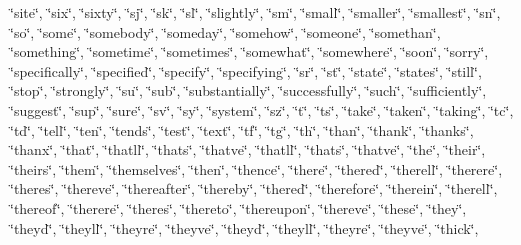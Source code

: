 \char`\"{}site\char`\"{}, \char`\"{}six\char`\"{}, \char`\"{}sixty\char`\"{}, \char`\"{}sj\char`\"{}, \char`\"{}sk\char`\"{}, \char`\"{}sl\char`\"{}, \char`\"{}slightly\char`\"{}, \char`\"{}sm\char`\"{}, \char`\"{}small\char`\"{}, \char`\"{}smaller\char`\"{}, \char`\"{}smallest\char`\"{}, \char`\"{}sn\char`\"{}, \char`\"{}so\char`\"{}, \char`\"{}some\char`\"{}, \char`\"{}somebody\char`\"{}, \char`\"{}someday\char`\"{}, \char`\"{}somehow\char`\"{}, \char`\"{}someone\char`\"{}, \char`\"{}somethan\char`\"{}, \char`\"{}something\char`\"{}, \char`\"{}sometime\char`\"{}, \char`\"{}sometimes\char`\"{}, \char`\"{}somewhat\char`\"{}, \char`\"{}somewhere\char`\"{}, \char`\"{}soon\char`\"{}, \char`\"{}sorry\char`\"{}, \char`\"{}specifically\char`\"{}, \char`\"{}specified\char`\"{}, \char`\"{}specify\char`\"{}, \char`\"{}specifying\char`\"{}, \char`\"{}sr\char`\"{}, \char`\"{}st\char`\"{}, \char`\"{}state\char`\"{}, \char`\"{}states\char`\"{}, \char`\"{}still\char`\"{}, \char`\"{}stop\char`\"{}, \char`\"{}strongly\char`\"{}, \char`\"{}su\char`\"{}, \char`\"{}sub\char`\"{}, \char`\"{}substantially\char`\"{}, \char`\"{}successfully\char`\"{}, \char`\"{}such\char`\"{}, \char`\"{}sufficiently\char`\"{}, \char`\"{}suggest\char`\"{}, \char`\"{}sup\char`\"{}, \char`\"{}sure\char`\"{}, \char`\"{}sv\char`\"{}, \char`\"{}sy\char`\"{}, \char`\"{}system\char`\"{}, \char`\"{}sz\char`\"{}, \char`\"{}t\char`\"{}, \char`\"{}t\textquotesingle{}s\char`\"{}, \char`\"{}take\char`\"{}, \char`\"{}taken\char`\"{}, \char`\"{}taking\char`\"{}, \char`\"{}tc\char`\"{}, \char`\"{}td\char`\"{}, \char`\"{}tell\char`\"{}, \char`\"{}ten\char`\"{}, \char`\"{}tends\char`\"{}, \char`\"{}test\char`\"{}, \char`\"{}text\char`\"{}, \char`\"{}tf\char`\"{}, \char`\"{}tg\char`\"{}, \char`\"{}th\char`\"{}, \char`\"{}than\char`\"{}, \char`\"{}thank\char`\"{}, \char`\"{}thanks\char`\"{}, \char`\"{}thanx\char`\"{}, \char`\"{}that\char`\"{}, \char`\"{}that\textquotesingle{}ll\char`\"{}, \char`\"{}that\textquotesingle{}s\char`\"{}, \char`\"{}that\textquotesingle{}ve\char`\"{}, \char`\"{}thatll\char`\"{}, \char`\"{}thats\char`\"{}, \char`\"{}thatve\char`\"{}, \char`\"{}the\char`\"{}, \char`\"{}their\char`\"{}, \char`\"{}theirs\char`\"{}, \char`\"{}them\char`\"{}, \char`\"{}themselves\char`\"{}, \char`\"{}then\char`\"{}, \char`\"{}thence\char`\"{}, \char`\"{}there\char`\"{}, \char`\"{}there\textquotesingle{}d\char`\"{}, \char`\"{}there\textquotesingle{}ll\char`\"{}, \char`\"{}there\textquotesingle{}re\char`\"{}, \char`\"{}there\textquotesingle{}s\char`\"{}, \char`\"{}there\textquotesingle{}ve\char`\"{}, \char`\"{}thereafter\char`\"{}, \char`\"{}thereby\char`\"{}, \char`\"{}thered\char`\"{}, \char`\"{}therefore\char`\"{}, \char`\"{}therein\char`\"{}, \char`\"{}therell\char`\"{}, \char`\"{}thereof\char`\"{}, \char`\"{}therere\char`\"{}, \char`\"{}theres\char`\"{}, \char`\"{}thereto\char`\"{}, \char`\"{}thereupon\char`\"{}, \char`\"{}thereve\char`\"{}, \char`\"{}these\char`\"{}, \char`\"{}they\char`\"{}, \char`\"{}they\textquotesingle{}d\char`\"{}, \char`\"{}they\textquotesingle{}ll\char`\"{}, \char`\"{}they\textquotesingle{}re\char`\"{}, \char`\"{}they\textquotesingle{}ve\char`\"{}, \char`\"{}theyd\char`\"{}, \char`\"{}theyll\char`\"{}, \char`\"{}theyre\char`\"{}, \char`\"{}theyve\char`\"{}, \char`\"{}thick\char`\"{}, 